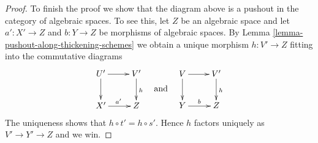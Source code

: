 \documentclass[10pt,a4paper]{amsart}
\theoremstyle{plain}
\theoremstyle{definition}
\theoremstyle{remark}
\numberwithin{equation}{subsection}
\begin{document}
\begin{proof}
\medskip\noindent
To finish the proof we show that the diagram above is a pushout in
the category of algebraic spaces. To see this, let $Z$ be an algebraic
space and let $a' : X' \to Z$ and $b : Y \to Z$ be morphisms of
algebraic spaces. By
Lemma \ref{lemma-pushout-along-thickening-schemes}
we obtain a unique morphism $h : V' \to Z$ fitting into the commutative
diagrams
$$
\vcenter{
\xymatrix{
U' \ar[d] \ar[r] & V' \ar[d]^h \\
X' \ar[r]^{a'} & Z
}
}
\quad\text{and}\quad
\vcenter{
\xymatrix{
V \ar[r] \ar[d] & V' \ar[d]^h \\
Y \ar[r]^b & Z
}
}
$$
The uniqueness shows that $h \circ t' = h \circ s'$. Hence $h$ factors
uniquely as $V' \to Y' \to Z$ and we win.
\end{proof}
\end{document}
